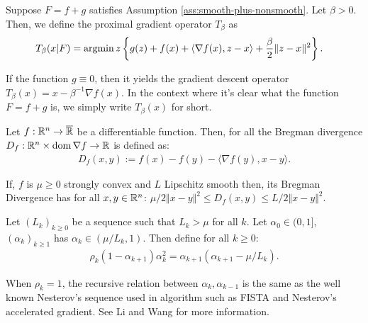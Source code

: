 \documentclass[12pt]{article}
\begin{document}
        \begin{definition}
            Suppose $F = f + g$ satisfies Assumption \ref{ass:smooth-plus-nonsmooth}. 
            Let $\beta > 0$. 
            Then, we define the proximal gradient operator $T_{\beta}$ as 
            \begin{align*}
                T_\beta (x | F) &= \mathop{\rm argmin}\limits{z} \left\lbrace
                    g(z) + f(x) + \langle \nabla f(x), z - x\rangle + \frac{\beta}{2}\Vert z - x\Vert^2
                \right\rbrace. 
            \end{align*}
        \end{definition}
        \begin{remark}
            If the function $g \equiv 0$, then it yields the gradient descent operator $T_\beta(x) = x - \beta^{-1}\nabla f(x)$. 
            In the context where it's clear what the function $F = f + g$ is, we simply write $T_\beta(x)$ for short. 
        \end{remark}

        \begin{definition}
            Let $f:\mathbb R^n \rightarrow \overline {\mathbb R}$ be a differentiable function. 
            Then, for all the Bregman divergence $D_f: \mathbb R^n \times \operatorname{dom}\nabla f \rightarrow \mathbb R$ is defined as: 
            \begin{align*}
                D_f(x, y) := f(x) - f(y) - \langle \nabla f(y), x - y\rangle. 
            \end{align*}
        \end{definition}
        \begin{remark}
            If, $f$ is $\mu \ge 0$ strongly convex and $L$ Lipschitz smooth then, its Bregman Divergence has for all $x, y \in \mathbb R^n$: $\mu/2 \Vert x - y\Vert^2 \le D_f(x, y) \le L/2 \Vert x - y\Vert^2$. 
        \end{remark}

        \begin{definition}\label{def:rwapg-seq}
            Let $(L_k)_{k \ge 0}$ be a sequence such that $L_k > \mu$ for all $k$. 
            Let $\alpha_0 \in (0, 1]$, $(\alpha_k)_{k \ge 1}$ has $\alpha_k \in (\mu/ L_k, 1)$. 
            Then define for all $k \ge 0$: 
            \begin{align*}
                \rho_k(1 - \alpha_{k + 1})\alpha_k^2 = \alpha_{k + 1}(\alpha_{k + 1} - \mu/L_k). 
            \end{align*}
        \end{definition}
        \begin{remark}
            When $\rho_k = 1$, the recursive relation between $\alpha_k, \alpha_{k - 1}$ is the same as the well known Nesterov's sequence used in algorithm such as FISTA and Nesterov's accelerated gradient. 
            See Li and Wang \cite{li_relaxed_2025} for more information. 
        \end{remark}
        
\end{document}
